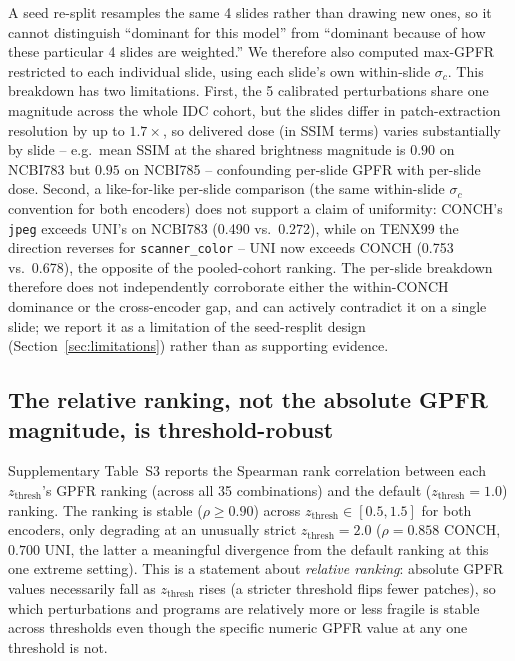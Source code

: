\documentclass[11pt]{article}
\begin{document}
A seed re-split resamples the same 4 slides rather than drawing new ones, so it cannot distinguish ``dominant for this model'' from ``dominant because of how these particular 4 slides are weighted.'' We therefore also computed max-GPFR restricted to each individual slide, using each slide's own within-slide $\sigma_c$. This breakdown has two limitations. First, the 5 calibrated perturbations share one magnitude across the whole IDC cohort, but the slides differ in patch-extraction resolution by up to $1.7\times$, so delivered dose (in SSIM terms) varies substantially by slide -- e.g.\ mean SSIM at the shared brightness magnitude is $0.90$ on NCBI783 but $0.95$ on NCBI785 -- confounding per-slide GPFR with per-slide dose. Second, a like-for-like per-slide comparison (the same within-slide $\sigma_c$ convention for both encoders) does not support a claim of uniformity: CONCH's \texttt{jpeg} exceeds UNI's on NCBI783 (0.490 vs.\ 0.272), while on TENX99 the direction reverses for \texttt{scanner\_color} -- UNI now exceeds CONCH (0.753 vs.\ 0.678), the opposite of the pooled-cohort ranking. The per-slide breakdown therefore does not independently corroborate either the within-CONCH dominance or the cross-encoder gap, and can actively contradict it on a single slide; we report it as a limitation of the seed-resplit design (Section~\ref{sec:limitations}) rather than as supporting evidence.




\subsection{The relative ranking, not the absolute GPFR magnitude, is threshold-robust}
Supplementary Table~S3 reports the Spearman rank correlation between each $z_{\text{thresh}}$'s GPFR ranking (across all 35 combinations) and the default ($z_{\text{thresh}}=1.0$) ranking. The ranking is stable ($\rho\ge0.90$) across $z_{\text{thresh}}\in[0.5,1.5]$ for both encoders, only degrading at an unusually strict $z_{\text{thresh}}=2.0$ ($\rho=0.858$ CONCH, $0.700$ UNI, the latter a meaningful divergence from the default ranking at this one extreme setting). This is a statement about \emph{relative ranking}: absolute GPFR values necessarily fall as $z_{\text{thresh}}$ rises (a stricter threshold flips fewer patches), so which perturbations and programs are relatively more or less fragile is stable across thresholds even though the specific numeric GPFR value at any one threshold is not.
\end{document}
